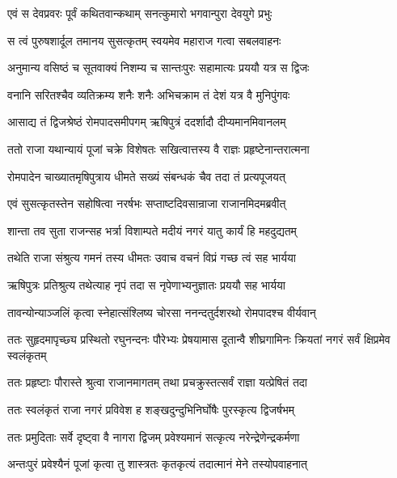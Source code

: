 \twolineshloka
{एवं स देवप्रवरः पूर्वं कथितवान्कथाम्}
{सनत्कुमारो भगवान्पुरा देवयुगे प्रभुः} %

\twolineshloka
{स त्वं पुरुषशार्दूल तमानय सुसत्कृतम्}
{स्वयमेव महाराज गत्वा सबलवाहनः} %

\twolineshloka
{अनुमान्य वसिष्ठं च सूतवाक्यं निशम्य च}
{सान्तःपुरः सहामात्यः प्रययौ यत्र स द्विजः} %

\twolineshloka
{वनानि सरितश्चैव व्यतिक्रम्य शनैः शनैः}
{अभिचक्राम तं देशं यत्र वै मुनिपुंगवः} %

\twolineshloka
{आसाद्य तं द्विजश्रेष्ठं रोमपादसमीपगम्}
{ऋषिपुत्रं ददर्शादौ दीप्यमानमिवानलम्} %

\twolineshloka
{ततो राजा यथान्यायं पूजां चक्रे विशेषतः}
{सखित्वात्तस्य वै राज्ञः प्रहृष्टेनान्तरात्मना} %

\twolineshloka
{रोमपादेन चाख्यातमृषिपुत्राय धीमते}
{सख्यं संबन्धकं चैव तदा तं प्रत्यपूजयत्} %

\twolineshloka
{एवं सुसत्कृतस्तेन सहोषित्वा नरर्षभः}
{सप्ताष्टदिवसान्राजा राजानमिदमब्रवीत्} %

\twolineshloka
{शान्ता तव सुता राजन्सह भर्त्रा विशाम्पते}
{मदीयं नगरं यातु कार्यं हि महदुद्यतम्} %

\twolineshloka
{तथेति राजा संश्रुत्य गमनं तस्य धीमतः}
{उवाच वचनं विप्रं गच्छ त्वं सह भार्यया} %

\twolineshloka
{ऋषिपुत्रः प्रतिश्रुत्य तथेत्याह नृपं तदा}
{स नृपेणाभ्यनुज्ञातः प्रययौ सह भार्यया} %

\twolineshloka
{तावन्योन्याञ्जलिं कृत्वा स्नेहात्संश्लिष्य चोरसा}
{ननन्दतुर्दशरथो रोमपादश्च वीर्यवान्} %

\threelineshloka
{ततः सुहृदमापृच्छ्य प्रस्थितो रघुनन्दनः}
{पौरेभ्यः प्रेषयामास दूतान्वै शीघ्रगामिनः}
{क्रियतां नगरं सर्वं क्षिप्रमेव स्वलंकृतम्} %

\twolineshloka
{ततः प्रहृष्टाः पौरास्ते श्रुत्वा राजानमागतम्}
{तथा प्रचक्रुस्तत्सर्वं राज्ञा यत्प्रेषितं तदा} %

\twolineshloka
{ततः स्वलंकृतं राजा नगरं प्रविवेश ह}
{शङ्खदुन्दुभिनिर्घोषैः पुरस्कृत्य द्विजर्षभम्} %

\twolineshloka
{ततः प्रमुदिताः सर्वे दृष्ट्वा वै नागरा द्विजम्}
{प्रवेश्यमानं सत्कृत्य नरेन्द्रेणेन्द्रकर्मणा} %

\twolineshloka
{अन्तःपुरं प्रवेश्यैनं पूजां कृत्वा तु शास्त्रतः}
{कृतकृत्यं तदात्मानं मेने तस्योपवाहनात्} %

